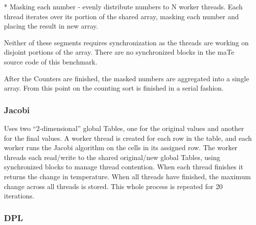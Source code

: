 * Masking each number - evenly distribute numbers to N worker threads.
Each thread iterates over its portion of the shared array, masking
each number and placing the result in new array.

Neither of these segments requires synchronization as the threads are
working on disjoint portions of the array.  There are no synchronized
blocks in the maTe source code of this benchmark.

After the Counters are finished, the masked numbers are aggregated
into a single array.  From this point on the counting sort is finished
in a serial fashion.

\subsubsection{Jacobi}

Uses two ``2-dimensional'' global Tables, one for the original values
and another for the final values.  A worker thread is created for each
row in the table, and each worker runs the Jacobi algorithm on the
cells in its assigned row.  The worker threads each read/write to the
shared original/new global Tables, using synchronized blocks to manage
thread contention.  When each thread finishes it returns the change in
temperature.  When all threads have finished, the maximum change
across all threads is stored.  This whole process is repeated for 20
iterations.

\subsubsection{DPL}
